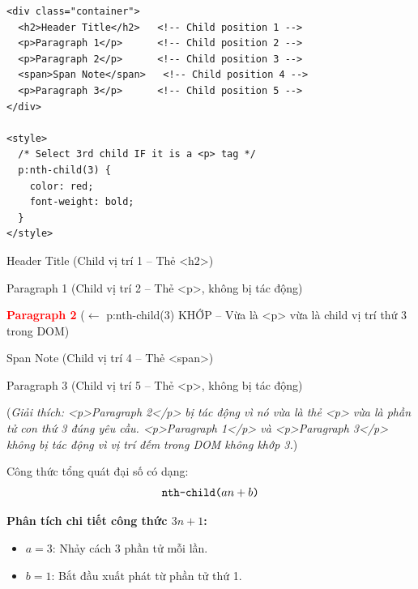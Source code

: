 \documentclass[11pt,oneside]{book}
\begin{document}
\begin{codeWindow}
\begin{lstlisting}[language=HTML5]
<div class="container">
  <h2>Header Title</h2>   <!-- Child position 1 -->
  <p>Paragraph 1</p>      <!-- Child position 2 -->
  <p>Paragraph 2</p>      <!-- Child position 3 -->
  <span>Span Note</span>   <!-- Child position 4 -->
  <p>Paragraph 3</p>      <!-- Child position 5 -->
</div>

<style>
  /* Select 3rd child IF it is a <p> tag */
  p:nth-child(3) {
    color: red;
    font-weight: bold;
  }
</style>
\end{lstlisting}
\end{codeWindow}

\begin{browserWindow}
\sffamily\small
Header Title {\scriptsize\textcolor{gray!60}{(Child vị trí 1 -- Thẻ <h2>)}} \par\vspace{2pt}
Paragraph 1 {\scriptsize\textcolor{gray!60}{(Child vị trí 2 -- Thẻ <p>, không bị tác động)}} \par\vspace{2pt}
\textcolor{red}{\textbf{Paragraph 2}} {\scriptsize\textcolor{gray!60}{($\leftarrow$ p:nth-child(3) KHỚP -- Vừa là <p> vừa là child vị trí thứ 3 trong DOM)}} \par\vspace{2pt}
Span Note {\scriptsize\textcolor{gray!60}{(Child vị trí 4 -- Thẻ <span>)}} \par\vspace{2pt}
Paragraph 3 {\scriptsize\textcolor{gray!60}{(Child vị trí 5 -- Thẻ <p>, không bị tác động)}} \par\vspace{4pt}
{\scriptsize\textcolor{gray!60}{(\textit{Giải thích: <p>Paragraph 2</p> bị tác động vì nó vừa là thẻ <p> vừa là phần tử con thứ 3 đúng yêu cầu. <p>Paragraph 1</p> và <p>Paragraph 3</p> không bị tác động vì vị trí đếm trong DOM không khớp 3.})}}
\end{browserWindow}

\begin{conceptBox}
Công thức tổng quát đại số có dạng:
\[ \text{\texttt{nth-child(}} a n + b \text{\texttt{)}} \]
\par\vspace{4pt}
\textbf{Phân tích chi tiết công thức $3n + 1$:}
\begin{itemize}[leftmargin=1.5em, itemsep=1pt, parsep=0pt]
    \item $a = 3$: Nhảy cách 3 phần tử mỗi lần.
    \item $b = 1$: Bắt đầu xuất phát từ phần tử thứ 1.
\end{itemize}
\end{conceptBox}
\end{document}
